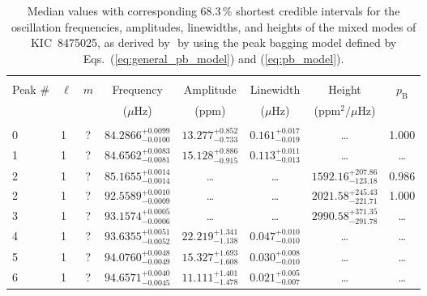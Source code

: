 \begin{table*}[!]
\caption{Median values with corresponding 68.3\,\% shortest credible intervals for the oscillation frequencies, amplitudes, linewidths, and heights of the mixed modes of KIC~8475025, as derived by \diamonds\,\,by using the peak bagging model defined by Eqs.~(\ref{eq:general_pb_model}) and (\ref{eq:pb_model}).}
\label{tab:8475025m}
\centering
\begin{tabular}{llcrrlrc}
\hline\hline
\\[-8pt]      
Peak \# & $\ell$ & $m$ & \multicolumn{1}{c}{Frequency} & \multicolumn{1}{c}{Amplitude} & \multicolumn{1}{c}{Linewidth} & \multicolumn{1}{c}{Height}& $p_\mathrm{B}$\\
 & & & \multicolumn{1}{c}{($\mu$Hz)} & \multicolumn{1}{c}{(ppm)} & \multicolumn{1}{c}{($\mu$Hz)} & \multicolumn{1}{c}{(ppm$^2/\mu$Hz)}\\
\hline \\[-8pt]
0 & 1 & ? & $     84.2866_{-      0.0100}^{+      0.0099}$ & $      13.277_{-       0.733}^{+       0.852}$ & $       0.161_{-       0.019}^{+       0.017}$ & \multicolumn{1}{c}{\dots} & 1.000\\[1pt]
1 & 1 & ? & $     84.6562_{-      0.0081}^{+      0.0083}$ & $      15.128_{-       0.915}^{+       0.886}$ & $       0.113_{-       0.013}^{+       0.011}$ & \multicolumn{1}{c}{\dots} & \dots \\[1pt]
2 & 1 & ? & $     85.1655_{-      0.0014}^{+      0.0014}$ & \multicolumn{1}{c}{\dots} & \multicolumn{1}{c}{\dots} & $     1592.16_{-      123.18}^{+      207.86}$ & 0.986\\[1pt]

2 & 1 & ? & $     92.5589_{-      0.0009}^{+      0.0010}$ & \multicolumn{1}{c}{\dots} & \multicolumn{1}{c}{\dots} & $     2021.58_{-      221.71}^{+      245.43}$ & 1.000\\[1pt]
3 & 1 & ? & $     93.1574_{-      0.0006}^{+      0.0005}$ & \multicolumn{1}{c}{\dots} & \multicolumn{1}{c}{\dots} & $     2990.58_{-      291.78}^{+      371.35}$ & \dots \\[1pt]
4 & 1 & ? & $     93.6355_{-      0.0052}^{+      0.0051}$ & $      22.219_{-       1.138}^{+       1.341}$ & $       0.047_{-       0.010}^{+       0.010}$ & \multicolumn{1}{c}{\dots} & \dots \\[1pt]
5 & 1 & ? & $     94.0760_{-      0.0049}^{+      0.0048}$ & $      15.327_{-       1.608}^{+       1.693}$ & $       0.030_{-       0.010}^{+       0.008}$ & \multicolumn{1}{c}{\dots} & \dots \\[1pt]
6 & 1 & ? & $     94.6571_{-      0.0045}^{+      0.0040}$ & $      11.111_{-       1.478}^{+       1.401}$ & $       0.021_{-       0.007}^{+       0.005}$ & \multicolumn{1}{c}{\dots} & \dots \\[1pt]


\end{tabular}
\end{table*}
